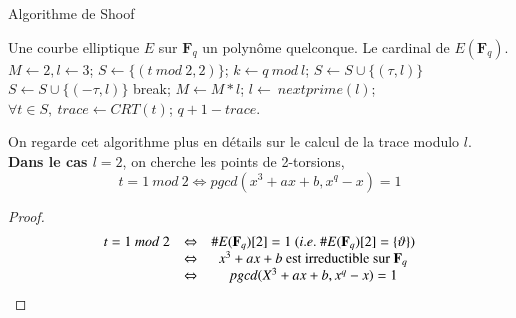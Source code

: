 \documentclass{article}%
\theoremstyle{plain}
\theoremstyle{definition}
\theoremstyle{plain}
\theoremstyle{plain}
\theoremstyle{remark}
\newcommand\fq{\mathbf{F}_{q}}
\begin{document}
\begin{algorithm}[H]
\caption{Algorithme de Shoof}
\label{schoof1}
\begin{algorithmic} 
\REQUIRE Une courbe elliptique $E$ sur $\fq$ un polynôme quelconque.
\ENSURE Le cardinal de $E(\fq)$.
\STATE $M\leftarrow 2, l\leftarrow 3$;
\STATE $S\leftarrow \{(t\ mod\ 2, 2)\}$; 
    \STATE $k\leftarrow q\ mod\ l$;	
            \STATE $S\leftarrow S\cup \{(\tau, l)\}$ \OR $S\leftarrow S\cup \{(-\tau, l)\}$ 
            \STATE break;
        \ENDIF
    \ENDFOR
    \STATE $M\leftarrow M*l$;
    \STATE $l\leftarrow\ nextprime(l)$; 	
\ENDWHILE
\STATE $\forall t\in S,\ trace\leftarrow CRT(t)$; 
\RETURN $q + 1 - trace$.
\end{algorithmic}
\end{algorithm}


On regarde cet algorithme plus en détails sur le calcul de la trace modulo $l$.\\

\textbf{Dans le cas $l = 2$}, on cherche les points de 2-torsions, 
\begin{equation}
t=1\ mod\ 2\Leftrightarrow pgcd(x^{3} + ax + b, x^{q} - x) = 1
\label{cas2}
\end{equation}
\begin{proof}
$$
\begin{array}{cl cl}
t=1\ mod\ 2 &\Leftrightarrow& \#E(\fq)[2] = 1\ (i.e.\ \#E(\fq)[2]=\{\vartheta\})\\
&\Leftrightarrow& x^{3} + ax + b\text{ est irreductible sur }\fq\\
&\Leftrightarrow& pgcd(X^{3} + ax + b, x^{q} - x) = 1
\end{array}
$$
\end{proof}
\end{document}
